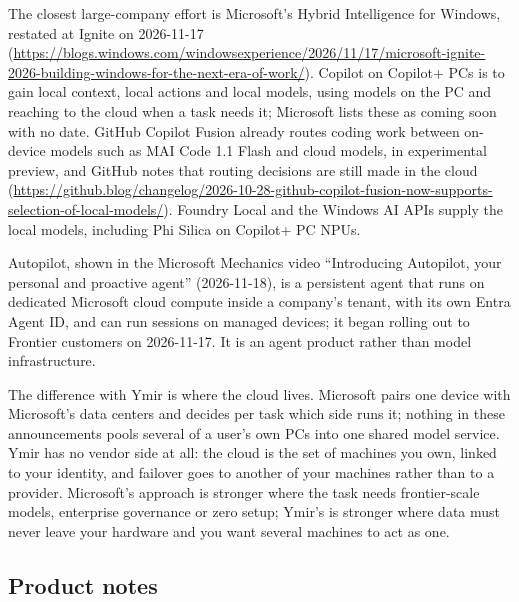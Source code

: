 The closest large-company effort is Microsoft's Hybrid Intelligence for Windows, restated at
Ignite on 2026-11-17
(\url{https://blogs.windows.com/windowsexperience/2026/11/17/microsoft-ignite-2026-building-windows-for-the-next-era-of-work/}).
Copilot on Copilot+ PCs is to gain local context, local actions and local models, using models on
the PC and reaching to the cloud when a task needs it; Microsoft lists these as coming soon with
no date. GitHub Copilot Fusion already routes coding work between on-device models such as MAI
Code 1.1 Flash and cloud models, in experimental preview, and GitHub notes that routing decisions
are still made in the cloud
(\url{https://github.blog/changelog/2026-10-28-github-copilot-fusion-now-supports-selection-of-local-models/}).
Foundry Local and the Windows AI APIs supply the local models, including Phi Silica on Copilot+
PC NPUs.

Autopilot, shown in the Microsoft Mechanics video ``Introducing Autopilot, your personal and
proactive agent'' (2026-11-18), is a persistent agent that runs on dedicated Microsoft cloud
compute inside a company's tenant, with its own Entra Agent ID, and can run sessions on managed
devices; it began rolling out to Frontier customers on 2026-11-17. It is an agent product rather
than model infrastructure.

The difference with Ymir is where the cloud lives. Microsoft pairs one device with Microsoft's
data centers and decides per task which side runs it; nothing in these announcements pools
several of a user's own PCs into one shared model service. Ymir has no vendor side at all: the
cloud is the set of machines you own, linked to your identity, and failover goes to another of
your machines rather than to a provider. Microsoft's approach is stronger where the task needs
frontier-scale models, enterprise governance or zero setup; Ymir's is stronger where data must
never leave your hardware and you want several machines to act as one.

\subsection{Product notes}\label{sec:cmp-notes}

